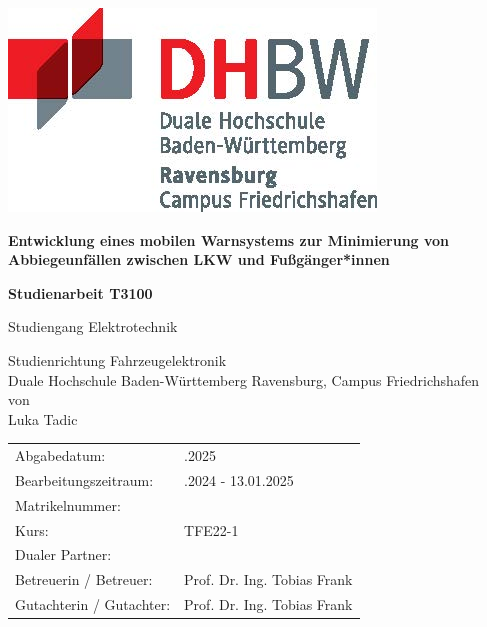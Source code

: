 \documentclass[a4paper, 12pt]{article} %
\newcommand{\titel}{Entwicklung eines mobilen Warnsystems zur Minimierung von Abbiegeunfällen zwischen LKW und Fußgänger*innen}
\newcommand{\arbeit}{Studienarbeit T3100}
\newcommand{\studiengang}{Elektrotechnik}
\newcommand{\studienrichtung}{Fahrzeugelektronik}
\newcommand{\autor}{Luka Tadic}
\newcommand{\abgabe}{13.01.2025}
\newcommand{\bearbeitungszeitraum}{09.10.2024 - 13.01.2025}
\newcommand{\matrikelnr}{5726700}
\newcommand{\kurs}{TFE22-1}
\newcommand{\firma}{}
\newcommand{\betreuerfirma}{Prof. Dr. Ing. Tobias Frank}
\newcommand{\gutachterdhbw}{Prof. Dr. Ing. Tobias Frank}
\begin{document}
\sloppy

\thispagestyle{empty}  %
\hypersetup{pageanchor=false}

\begin{titlepage}
\enlargethispage{4.0cm}
\sffamily  %

\parbox{0.5\linewidth}{
    \begin{flushleft}
    \end{flushleft}
}
\parbox{0.5\linewidth}{
    \begin{flushright}
        \includegraphics[width=0.4\linewidth]{images/DHBW_d_R_FN_46mm_4c}\\[5ex]
    \end{flushright}
}

\begin{center}

{\fontsize{20.74pt}{24pt}\selectfont
\textbf{\titel}\\[1.5ex]}

{\fontsize{17pt}{20pt}\selectfont
\textbf{\arbeit}\\[2ex]}

{\fontsize{14pt}{17pt}\selectfont
Studiengang \studiengang\\[2ex]}

{\fontsize{12pt}{14pt}\selectfont
Studienrichtung \studienrichtung\\[1ex]
Duale Hochschule Baden-Württemberg Ravensburg, Campus Friedrichshafen\\[5ex]
von\\[1ex]
\autor\\[15ex]}

\end{center}

\begin{center}
{\fontsize{12pt}{14pt}\selectfont
\begin{tabular}{ll}
Abgabedatum:                    & \quad \abgabe \\  
Bearbeitungszeitraum:           & \quad \bearbeitungszeitraum \\  
Matrikelnummer:                 & \quad \matrikelnr \\  
Kurs:                           & \quad \kurs \\  
Dualer Partner:                 & \quad \firma \\ %
Betreuerin / Betreuer:          & \quad \betreuerfirma \\  
Gutachterin / Gutachter:        & \quad \gutachterdhbw \\ [2ex]
\end{tabular}
}
\end{center}


\end{titlepage}
\end{document}
